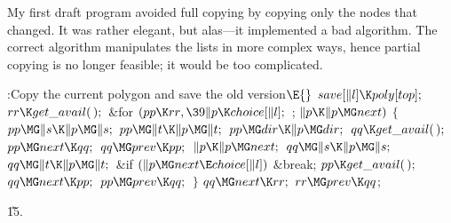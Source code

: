 My first draft program avoided full copying by copying only the nodes
that changed. It was rather elegant, but alas---it implemented a bad algorithm.
The correct algorithm manipulates the lists in more complex ways, hence
partial copying is no longer feasible; it would be too complicated.

\Y\B\4:Copy the current polygon and save the old version\X${}\E{}$\6
$\\{save}[\|l]\K\\{poly}[\\{top}];{}$\6
${}\\{rr}\K\\{get\_avail}(\,);{}$\6
\&{for} ${}(\\{pp}\K\\{rr},\39\|p\K\\{choice}[\|l];{}$  ; ${}\|p\K\|p\MG%
\\{next}){}$\5
${}\{{}$\1\6
${}\\{pp}\MG\|s\K\|p\MG\|s;{}$\6
${}\\{pp}\MG\|t\K\|p\MG\|t;{}$\6
${}\\{pp}\MG\\{dir}\K\|p\MG\\{dir};{}$\6
${}\\{qq}\K\\{get\_avail}(\,);{}$\6
${}\\{pp}\MG\\{next}\K\\{qq};{}$\6
${}\\{qq}\MG\\{prev}\K\\{pp};{}$\6
${}\|p\K\|p\MG\\{next};{}$\6
${}\\{qq}\MG\|s\K\|p\MG\|s;{}$\6
${}\\{qq}\MG\|t\K\|p\MG\|t;{}$\6
\&{if} ${}(\|p\MG\\{next}\E\\{choice}[\|l]){}$\1\5
\&{break};\2\6
${}\\{pp}\K\\{get\_avail}(\,);{}$\6
${}\\{qq}\MG\\{next}\K\\{pp};{}$\6
${}\\{pp}\MG\\{prev}\K\\{qq};{}$\6
\4${}\}{}$\2\6
${}\\{qq}\MG\\{next}\K\\{rr};{}$\6
${}\\{rr}\MG\\{prev}\K\\{qq}{}$;\par
\U15.\fi

